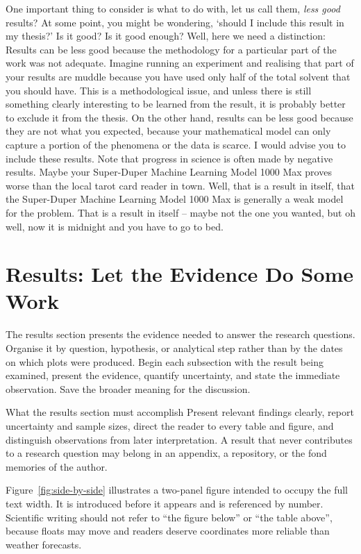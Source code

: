\documentclass[masters,en,listoffigures,listoftables,acronyms]{NMBU}
\begin{document}
One important thing to consider is what to do with, let us call them, \emph{less good} results?
At some point, you might be wondering, `should I include this result in my thesis?'
Is it good?
Is it good enough?
Well, here we need a distinction: Results can be less good because the methodology for a particular part of the work was not adequate.
Imagine running an experiment and realising that part of your results are muddle because you have used only half of the total solvent that you should have.
This is a methodological issue, and unless there is still something clearly interesting to be learned from the result, it is probably better to exclude it from the thesis.
On the other hand, results can be less good because they are not what you expected, because your mathematical model can only capture a portion of the phenomena or the data is scarce.
I would advise you to include these results.
Note that progress in science is often made by negative results.
Maybe your Super-Duper Machine Learning Model 1000 Max proves worse than the local tarot card reader in town.
Well, that is a result in itself, that the Super-Duper Machine Learning Model 1000 Max is generally a weak model for the problem.
That is a result in itself -- maybe not the one you wanted, but oh well, now it is midnight and you have to go to bed.

\clearpage
\section{Results: Let the Evidence Do Some Work}\label{sec:results}

The results section presents the evidence needed to answer the research
questions. Organise it by question, hypothesis, or analytical step rather than
by the dates on which plots were produced. Begin each subsection with the
result being examined, present the evidence, quantify uncertainty, and state the
immediate observation. Save the broader meaning for the discussion.

\begin{thesispoint}{What the results section must accomplish}
Present relevant findings clearly, report uncertainty and sample sizes, direct
the reader to every table and figure, and distinguish observations from later
interpretation. A result that never contributes to a research question may
belong in an appendix, a repository, or the fond memories of the author.
\end{thesispoint}

Figure~\ref{fig:side-by-side} illustrates a two-panel figure intended to occupy
the full text width. It is introduced before it appears and is referenced by
number. Scientific writing should not refer to ``the figure below'' or ``the
table above'', because floats may move and readers deserve coordinates more
reliable than weather forecasts.
\end{document}
